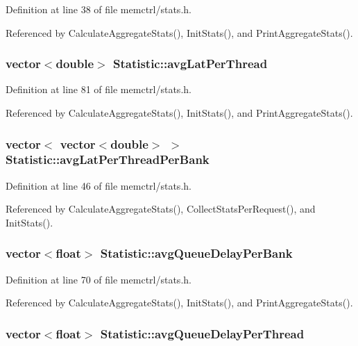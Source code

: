 Definition at line 38 of file memctrl/stats.h.

Referenced by CalculateAggregateStats(), InitStats(), and PrintAggregateStats().
\subsubsection[{avgLatPerThread}]{\setlength{\rightskip}{0pt plus 5cm}vector$<$double$>$ {\bf Statistic::avgLatPerThread}}\label{classStatistic_7a6f92c59ce5d33f3c4a3a9913a708d5}




Definition at line 81 of file memctrl/stats.h.

Referenced by CalculateAggregateStats(), InitStats(), and PrintAggregateStats().
\subsubsection[{avgLatPerThreadPerBank}]{\setlength{\rightskip}{0pt plus 5cm}vector$<$ vector$<$double$>$ $>$ {\bf Statistic::avgLatPerThreadPerBank}}\label{classStatistic_fdf7d59fa40a44cfe10fdaa54e295e68}




Definition at line 46 of file memctrl/stats.h.

Referenced by CalculateAggregateStats(), CollectStatsPerRequest(), and InitStats().
\subsubsection[{avgQueueDelayPerBank}]{\setlength{\rightskip}{0pt plus 5cm}vector$<$float$>$ {\bf Statistic::avgQueueDelayPerBank}}\label{classStatistic_f70558e42d5809b6d8681600a660f472}




Definition at line 70 of file memctrl/stats.h.

Referenced by CalculateAggregateStats(), InitStats(), and PrintAggregateStats().
\subsubsection[{avgQueueDelayPerThread}]{\setlength{\rightskip}{0pt plus 5cm}vector$<$float$>$ {\bf Statistic::avgQueueDelayPerThread}}\label{classStatistic_cfff37a508f257147bf57378a6c3c751}




